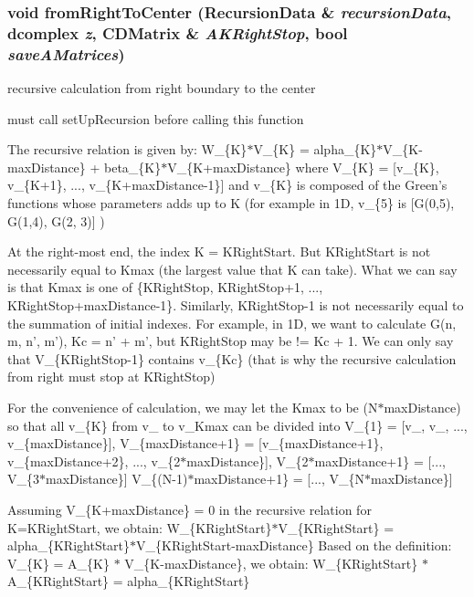 \subsubsection{\setlength{\rightskip}{0pt plus 5cm}void from\-Right\-To\-Center (\bf{Recursion\-Data} \& {\em recursion\-Data}, \bf{dcomplex} {\em z}, \bf{CDMatrix} \& {\em AKRight\-Stop}, bool {\em save\-AMatrices})}\label{recursiveCalculation_8h_8da3dfb029980c8d340e6b15fc4aefc3}


recursive calculation from right boundary to the center

must call set\-Up\-Recursion before calling this function 

The recursive relation is given by: W\_\-\{K\}$\ast$V\_\-\{K\} = alpha\_\-\{K\}$\ast$V\_\-\{K-max\-Distance\} + beta\_\-\{K\}$\ast$V\_\-\{K+max\-Distance\} where V\_\-\{K\} = [v\_\-\{K\}, v\_\-\{K+1\}, ..., v\_\-\{K+max\-Distance-1\}] and v\_\-\{K\} is composed of the Green's functions whose parameters adds up to K (for example in 1D, v\_\-\{5\} is [G(0,5), G(1,4), G(2, 3)] )

At the right-most end, the index K = KRight\-Start. But KRight\-Start is not necessarily equal to Kmax (the largest value that K can take). What we can say is that Kmax is one of \{KRight\-Stop, KRight\-Stop+1, ..., KRight\-Stop+max\-Distance-1\}. Similarly, KRight\-Stop-1 is not necessarily equal to the summation of initial indexes. For example, in 1D, we want to calculate G(n, m, n', m'), Kc = n' + m', but KRight\-Stop may be != Kc + 1. We can only say that V\_\-\{KRight\-Stop-1\} contains v\_\-\{Kc\} (that is why the recursive calculation from right must stop at KRight\-Stop)

For the convenience of calculation, we may let the Kmax to be (N$\ast$max\-Distance) so that all v\_\-\{K\} from v\_ to v\_\-Kmax can be divided into V\_\-\{1\} = [v\_, v\_, ..., v\_\-\{max\-Distance\}], V\_\-\{max\-Distance+1\} = [v\_\-\{max\-Distance+1\}, v\_\-\{max\-Distance+2\}, ..., v\_\-\{2$\ast$max\-Distance\}], V\_\-\{2$\ast$max\-Distance+1\} = [..., V\_\-\{3$\ast$max\-Distance\}] V\_\-\{(N-1)$\ast$max\-Distance+1\} = [..., V\_\-\{N$\ast$max\-Distance\}]

Assuming V\_\-\{K+max\-Distance\} = 0 in the recursive relation for K=KRight\-Start, we obtain: W\_\-\{KRight\-Start\}$\ast$V\_\-\{KRight\-Start\} = alpha\_\-\{KRight\-Start\}$\ast$V\_\-\{KRight\-Start-max\-Distance\} Based on the definition: V\_\-\{K\} = A\_\-\{K\} $\ast$ V\_\-\{K-max\-Distance\}, we obtain: W\_\-\{KRight\-Start\} $\ast$ A\_\-\{KRight\-Start\} = alpha\_\-\{KRight\-Start\}

